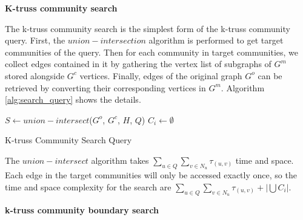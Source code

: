 \vskip 0.1in \noindent \textbf{K-truss community search}

The k-truss community search is the simplest form of the \bottomlevelprob{} k-truss community query. First, the $union-intersection$ algorithm is performed to get target communities of the query. Then for each community in target communities, we collect edges contained in it by gathering the vertex list of subgraphs of $G^m$ stored alongside $G^c$ vertices. Finally, edges of the original graph $G^o$ can be retrieved by converting their corresponding vertices in $G^m$. Algorithm \ref{alg:search_query} %
shows the details.

\begin{algorithm}
	\BlankLine
	$S \gets union-intersect$($G^o$, $G^c$, $H$, $Q$)\;
	 {
		$C_i \gets \emptyset$\;
	}
	\caption{K-truss Community Search Query}\label{alg:search_query}
\end{algorithm}

The $union-intersect$ algorithm takes $\sum_{u \in Q}{\sum_{v \in N_u}{\tau_{(u,v)}}}$ time and space. Each edge in the target communities will only be accessed exactly once, so the time and space complexity for the search are $\sum_{u \in Q}{\sum_{v \in N_u}{\tau_{(u,v)}}} + |\bigcup{C_i}|$.


\vskip 0.1in \noindent \textbf{k-truss community boundary search}

